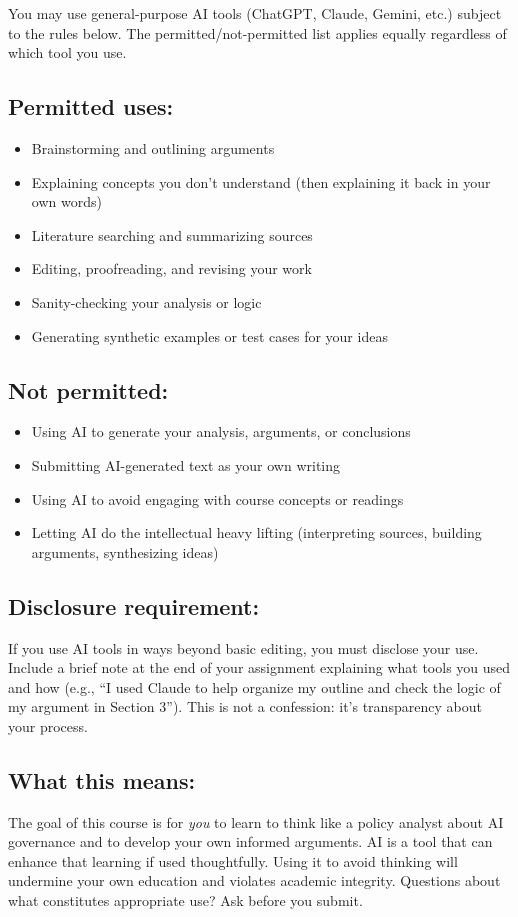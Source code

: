 \documentclass[12pt]{article}
\begin{document}
You may use general-purpose AI tools (ChatGPT, Claude, Gemini, etc.) subject to the rules below. The permitted/not-permitted list applies equally regardless of which tool you use.

\subsection*{Permitted uses:}
\begin{itemize}
\item Brainstorming and outlining arguments
\item Explaining concepts you don't understand (then explaining it back in your own words)
\item Literature searching and summarizing sources
\item Editing, proofreading, and revising your work
\item Sanity-checking your analysis or logic
\item Generating synthetic examples or test cases for your ideas
\end{itemize}

\subsection*{Not permitted:}
\begin{itemize}
\item Using AI to generate your analysis, arguments, or conclusions
\item Submitting AI-generated text as your own writing
\item Using AI to avoid engaging with course concepts or readings
\item Letting AI do the intellectual heavy lifting (interpreting sources, building arguments, synthesizing ideas)
\end{itemize}

\subsection*{Disclosure requirement:}
If you use AI tools in ways beyond basic editing, you must disclose your use. Include a brief note at the end of your assignment explaining what tools you used and how (e.g., ``I used Claude to help organize my outline and check the logic of my argument in Section 3''). This is not a confession: it's transparency about your process.

\subsection*{What this means:}
The goal of this course is for \emph{you} to learn to think like a policy analyst about AI governance and to develop your own informed arguments. AI is a tool that can enhance that learning if used thoughtfully. Using it to avoid thinking will undermine your own education and violates academic integrity. Questions about what constitutes appropriate use? Ask before you submit.
\end{document}
